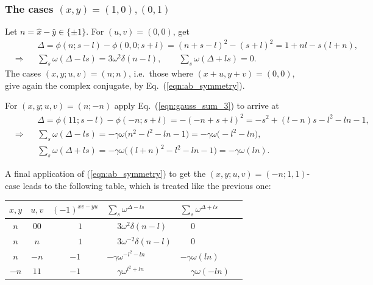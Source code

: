 \documentclass[aps,nofootinbib,floatfix,a4paper]{revtex4}
\newcommand{\1}{\mbox{$\mathbf{1}$}}
\begin{document}
\subsubsection{The cases $(x,y)=(1,0), (0,1)$}

Let $n=\hat x - \hat y\in \{\pm 1\}$.
For $(u,v)=(0,0)$, get
\begin{align*}
	&&
	&\Delta
	=
	\phi(n;s-l)
	-
	\phi(0,0;s+l)
	=
	(n+s-l)^2 - (s+l)^2
	=
	1+nl %
	-s(l+n),
	\\
	&\Rightarrow&
	&\sum_s \omega(\Delta-ls) 
	=	
	3
	\omega^2 %
	\delta(n-l),
	\qquad
	\sum_s \omega(\Delta+ls) 
	=
	0.
\end{align*}
The cases $(x,y;u,v)=(n;n)$,
i.e.\ those where $(x+u, y+v)=(0,0)$, give again the complex conjugate, by Eq.~(\ref{eqn:ab_symmetry}).

For $(x,y;u,v)=(n;-n)$ apply Eq.~(\ref{eqn:gauss_sum_3}) to arrive at
\begin{align*} 
	&&
	&\Delta
	=
	\phi(11;s-l)
	-
	\phi(-n;s+l)
	=
	- (-n+s+l)^2
	=
	-s^2
	+
	(l-n)s
	-l^2
	-ln
	-1
	,
	\\
	&\Rightarrow&
	&\sum_s \omega(\Delta-ls) 
	=
	-\gamma \omega\big(
		n^2 %
		-l^2
		-ln
		-1
	\big)
	=
	-\gamma \omega\big(
		-l^2
		-ln
	\big),
	\\
	&&
	&\sum_s \omega(\Delta+ls) 
	=
	-\gamma \omega\big(
		(l+n)^2 %
		-l^2
		-ln
		-1
	\big)
	=
	-\gamma \omega( ln).
\end{align*}

A final application of (\ref{eqn:ab_symmetry}) to get the $(x,y;u,v)=(-n;1,1)$-case 
leads to the following table, which is treated like the previous one:
\begin{center}
	\begin{tabular}{|c|c|c||l|l|l|}
		\hline
		$x,y$ & $u,v$ & $(-1)^{xv-yu}$ &  $\sum_s \omega^{\Delta-ls}$ & $\sum_s\omega^{\Delta+ls}$ \\
		\hline
$n$&00   & $\phantom{-}1$	& $\phantom{-}3\omega^2\delta(n-l)$    & $\phantom{-}0$ \\
$n$&$n$  & $\phantom{-}1$	& $\phantom{-}3\omega^{-2}\delta(n-l)$ & $\phantom{-}0$ \\
$n$&$-n$ & $-1$           & $-\gamma \omega^{-l^2-ln}$           & $-\gamma\omega(ln)$ \\
$-n$&$11$& $-1$           & $\phantom{-}\gamma \omega^{l^2+ln}$  & $\phantom{-}\gamma\omega(-ln)$ \\
		\hline
	\end{tabular}
\end{center}
\end{document}
